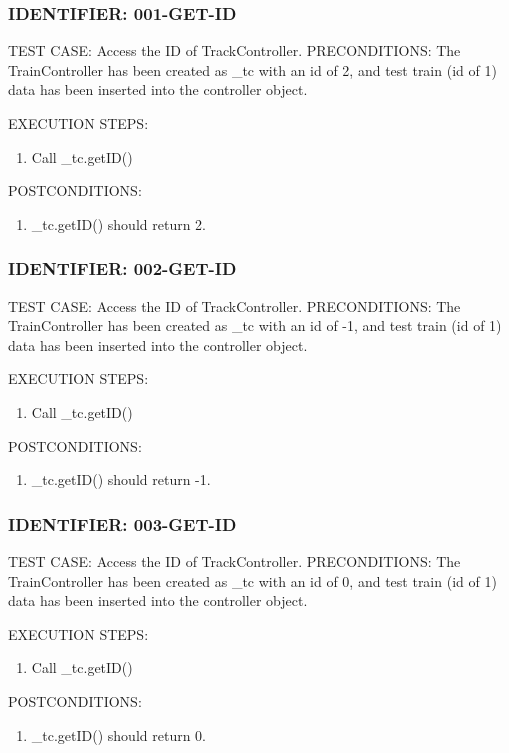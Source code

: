 \documentclass{scrreprt}
\begin{document}
\subsubsection{IDENTIFIER: 001-GET-ID}
TEST CASE: Access the ID of TrackController.
PRECONDITIONS: The TrainController has been created as _tc with an id of 2, and test train (id of 1) data has been inserted into the controller object.

EXECUTION STEPS:
\begin{enumerate}
	\item Call _tc.getID()
\end{enumerate}
POSTCONDITIONS:
\begin{enumerate}
	\item _tc.getID() should return 2.
\end{enumerate}

\subsubsection{IDENTIFIER: 002-GET-ID}
TEST CASE: Access the ID of TrackController.
PRECONDITIONS: The TrainController has been created as _tc with an id of -1, and test train (id of 1) data has been inserted into the controller object.

EXECUTION STEPS:
\begin{enumerate}
	\item Call _tc.getID()
\end{enumerate}
POSTCONDITIONS:
\begin{enumerate}
	\item _tc.getID() should return -1.
\end{enumerate}

\subsubsection{IDENTIFIER: 003-GET-ID}
TEST CASE: Access the ID of TrackController.
PRECONDITIONS: The TrainController has been created as _tc with an id of 0, and test train (id of 1) data has been inserted into the controller object.

EXECUTION STEPS:
\begin{enumerate}
	\item Call _tc.getID()
\end{enumerate}
POSTCONDITIONS:
\begin{enumerate}
	\item _tc.getID() should return 0.
\end{enumerate}
\end{document}
